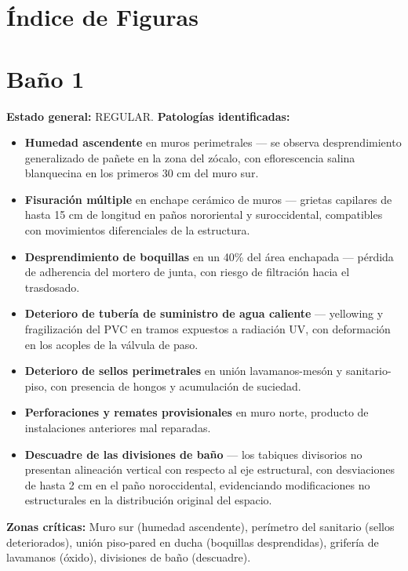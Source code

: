 \documentclass[12pt]{article}
\begin{document}
\thispagestyle{empty}
\newpage
\section*{\color{primary}\lsstyle Índice de Figuras}
\listoffigures
\newpage
\section{Baño 1}
\noindent\textbf{Estado general:} REGULAR.
\medskip
\noindent\textbf{Patologías identificadas:}
\begin{itemize}[leftmargin=*,nosep]
  \item \textbf{Humedad ascendente} en muros perimetrales — se observa desprendimiento generalizado de pañete en la zona del zócalo, con eflorescencia salina blanquecina en los primeros 30 cm del muro sur.
  \item \textbf{Fisuración múltiple} en enchape cerámico de muros — grietas capilares de hasta 15 cm de longitud en paños nororiental y suroccidental, compatibles con movimientos diferenciales de la estructura.
  \item \textbf{Desprendimiento de boquillas} en un 40\% del área enchapada — pérdida de adherencia del mortero de junta, con riesgo de filtración hacia el trasdosado.
  \item \textbf{Deterioro de tubería de suministro de agua caliente} — yellowing y fragilización del PVC en tramos expuestos a radiación UV, con deformación en los acoples de la válvula de paso.
  \item \textbf{Deterioro de sellos perimetrales} en unión lavamanos-mesón y sanitario-piso, con presencia de hongos y acumulación de suciedad.
  \item \textbf{Perforaciones y remates provisionales} en muro norte, producto de instalaciones anteriores mal reparadas.
  \item \textbf{Descuadre de las divisiones de baño} — los tabiques divisorios no presentan alineación vertical con respecto al eje estructural, con desviaciones de hasta 2 cm en el paño noroccidental, evidenciando modificaciones no estructurales en la distribución original del espacio.
\end{itemize}
\medskip
\noindent\textbf{Zonas críticas:} Muro sur (humedad ascendente), perímetro del sanitario (sellos deteriorados), unión piso-pared en ducha (boquillas desprendidas), grifería de lavamanos (óxido), divisiones de baño (descuadre).
\bigskip
\end{document}
